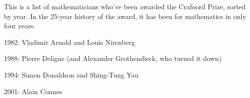 \documentclass[12pt]{article}
\begin{document}
This is a list of mathematicians who've been awarded the Crafoord Prize, sorted by year. In the 25-year history of the award, it has been for mathematics in only four years.

1982: Vladimir Arnold and Louis Nirenberg

1988: Pierre Deligne (and Alexander Grothendieck, who turned it down)

1994: Simon Donaldson and Shing-Tung Yau

2001: Alain Connes

\end{document}
